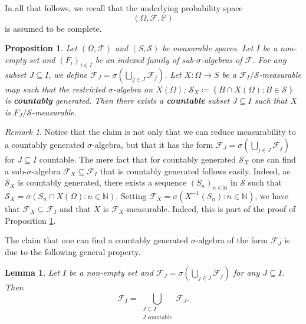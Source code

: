 \documentclass[11pt,a4paper,twoside,openany]{report}
\numberwithin{equation}{section}
\theoremstyle{plain} %
\newtheorem{proposition}[theorem]{Proposition}
\newtheorem{lemma}[theorem]{Lemma}
\theoremstyle{definition} %
\theoremstyle{remark} %
\newtheorem{remark}[theorem]{Remark}
\begin{document}
 
 In all that follows, we recall that the underlying probability space 
 \begin{equation*}
     (\Omega,\mathcal{F},\mathbb{P})
 \end{equation*}
 is assumed to be complete.
 \begin{proposition}\label{prop:reduction to countable measurability}
     Let \((\Omega,\mathcal{F})\) and \((S,\mathcal{S})\) be measurable spaces. Let \(I\) be a non-empty set and \((F_i)_{i\in I}\) be an indexed family of sub-\(\sigma\)-algebras of \(\mathcal{F}\). For any subset \(J\subseteq I\), we define \(\mathcal{F}_J=\sigma(\bigcup_{j\in J}\mathcal{F}_j)\). Let \(X:\Omega\to S\) be a \(\mathcal{F}_I/\mathcal
     S\)-measurable map such that the restricted \(\sigma\)-algebra on \(X(\Omega)\); \(\mathcal{S}_X\coloneqq\left\{B\cap X(\Omega):B\in \mathcal{S}\right\}\) is \textbf{countably} generated. Then there exists a \textbf{countable} subset \(J\subseteq I\) such that \(X\) is \(F_{J}/\mathcal{S}\)-measurable. 
 \end{proposition}
 \begin{remark}\label{Remark:countably generated sigma algebra}
      Notice that the claim is not only that we can reduce measurability to a countably generated \(\sigma\)-algebra, but that it has the form \(\mathcal{F}_J=\sigma(\bigcup_{j\in J}\mathcal{F}_j)\) for \(J\subseteq I\) countable. The mere fact that for countably generated \(\mathcal{S}_X\) one can find a sub-\(\sigma\)-algebra \(\mathcal{F}_X\subseteq\mathcal{F}_I\) that is countably generated follows easily. Indeed, as \(\mathcal{S}_X\) is countably generated, there exists a sequence \((S_n)_{n\in\mathbb{N}}\) in \(\mathcal{S}\) such that \(\mathcal{S}_X=\sigma(S_n\cap X(\Omega):n\in\mathbb{N})\). Setting 
 \(\mathcal{F}_X=\sigma(X^{-1}(S_n):n\in\mathbb{N})\), we have that \(\mathcal{F}_X\subseteq\mathcal{F}_I\) and that \(X\) is \(\mathcal{F}_X\)-measurable. Indeed, this is part of the proof of Proposition \ref{prop:reduction to countable measurability}. 
 \end{remark}
The claim that one can find a countably generated \(\sigma\)-algebra of the form \(\mathcal{F}_J\) is  due to the following general property.
 \begin{lemma}\label{lemma:reduction to countable measurability}
     Let \(I\) be a non-empty set and \(\mathcal{F}_J=\sigma(\bigcup_{j\in J}\mathcal{F}_j)\) for any \(J\subseteq I\). Then 
     \begin{equation}\label{eq:reduction to countable measurability}
         \mathcal{F}_I=\bigcup_{\substack{J\subseteq I\\ J\text{ countable}}}\mathcal{F}_J.
     \end{equation}
 \end{lemma}
\end{document}
